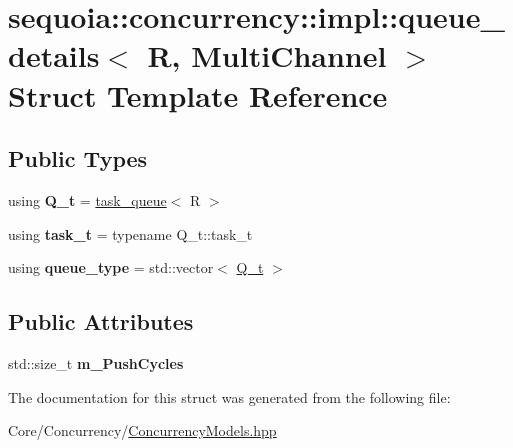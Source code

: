\hypertarget{structsequoia_1_1concurrency_1_1impl_1_1queue__details}{}\section{sequoia\+::concurrency\+::impl\+::queue\+\_\+details$<$ R, Multi\+Channel $>$ Struct Template Reference}
\label{structsequoia_1_1concurrency_1_1impl_1_1queue__details}
\subsection*{Public Types}
\begin{DoxyCompactItemize}
\item 
\mbox{\label{structsequoia_1_1concurrency_1_1impl_1_1queue__details_a0cf7b3d22995a6d14c82f99eea80536b}} 
using {\bfseries Q\+\_\+t} = \mbox{\hyperlink{classsequoia_1_1concurrency_1_1task__queue}{task\+\_\+queue}}$<$ R $>$
\item 
\mbox{\label{structsequoia_1_1concurrency_1_1impl_1_1queue__details_ae80b613d80b51486c26477c9724489ed}} 
using {\bfseries task\+\_\+t} = typename Q\+\_\+t\+::task\+\_\+t
\item 
\mbox{\label{structsequoia_1_1concurrency_1_1impl_1_1queue__details_a9735c2578dd4a7e692ab085beb6c455c}} 
using {\bfseries queue\+\_\+type} = std\+::vector$<$ \mbox{\hyperlink{classsequoia_1_1concurrency_1_1task__queue}{Q\+\_\+t}} $>$
\end{DoxyCompactItemize}
\subsection*{Public Attributes}
\begin{DoxyCompactItemize}
\item 
\mbox{\label{structsequoia_1_1concurrency_1_1impl_1_1queue__details_a94bffd05eca6ba927ed7f83a3247e7f7}} 
std\+::size\+\_\+t {\bfseries m\+\_\+\+Push\+Cycles}
\end{DoxyCompactItemize}


The documentation for this struct was generated from the following file\+:\begin{DoxyCompactItemize}
\item 
Core/\+Concurrency/\mbox{\hyperlink{_concurrency_models_8hpp}{Concurrency\+Models.\+hpp}}\end{DoxyCompactItemize}
